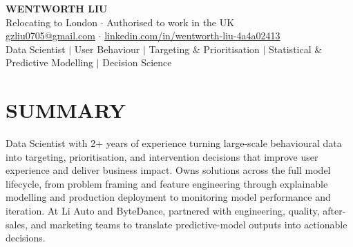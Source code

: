\documentclass[a4paper,10pt]{article}
\begin{document}
\fontsize{8.4pt}{9.4pt}\selectfont

\begin{center}
{\Large\bfseries WENTWORTH LIU}\\[1pt]
{\small Relocating to London \;$\cdot$\; Authorised to work in the UK}\\[1pt]
{\fontsize{8pt}{9pt}\selectfont \href{mailto:gzliu0705@gmail.com}{gzliu0705@gmail.com} \;$\cdot$\; \href{https://www.linkedin.com/in/wentworth-liu-4a4a02413}{linkedin.com/in/wentworth-liu-4a4a02413}}\\[1pt]
{\fontsize{8.6pt}{9.2pt}\selectfont Data Scientist \;$\vert$\; User Behaviour \;$\vert$\; Targeting \& Prioritisation \;$\vert$\; Statistical \& Predictive Modelling \;$\vert$\; Decision Science}
\end{center}
\vspace{-5pt}

\section{SUMMARY}
Data Scientist with 2+ years of experience turning large-scale behavioural data into targeting, prioritisation, and intervention decisions that improve user experience and deliver business impact. Owns solutions across the full model lifecycle, from problem framing and feature engineering through explainable modelling and production deployment to monitoring model performance and iteration. At Li Auto and ByteDance, partnered with engineering, quality, after-sales, and marketing teams to translate predictive-model outputs into actionable decisions.
\end{document}
